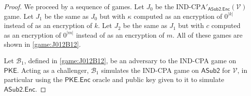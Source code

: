 \begin{proof}

We proceed by a sequence of games. Let $J_0$ be the $\mathrm{IND}\text{-}\mathrm{CPA}'_{\mathsf{ASub2.Enc}}(\mathcal{V})$ game. Let $J_1$ be the same as $J_0$ but with $\kappa$ computed as an encryption of $0^{|k|}$ instead of as an encryption of $k$. Let $J_2$ be the same as $J_1$ but with $c$ computed as an encryption of $0^{|m|}$ instead of as an encryption of $m$. All of these games are shown in \autoref{game:J012B12}.

Let $\mathcal{B}_1$, defined in \autoref{game:J012B12}, be an adversary to the IND-CPA game on $\mathsf{PKE}$. Acting as a challenger, $\mathcal{B}_1$ simulates the IND-CPA game on $\mathsf{ASub2}$ for $\mathcal{V}$, in particular using the $\mathsf{PKE.Enc}$ oracle and public key given to it to simulate $\mathsf{ASub2.Enc}$.


\end{proof}
